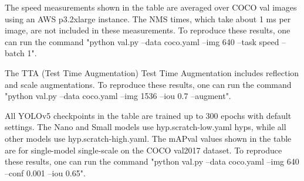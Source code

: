 \begin{itemize}
\begin{table}[h]
The speed measurements shown in the table are averaged over COCO val images using an AWS p3.2xlarge instance. The NMS times, which take about 1 ms per image, are not included in these measurements. To reproduce these results, one can run the command "python val.py --data coco.yaml --img 640 --task speed --batch 1".\cite{U23}

The TTA (Test Time Augmentation) Test Time Augmentation includes reflection and scale augmentations. To reproduce these results, one can run the command "python val.py --data coco.yaml --img 1536 --iou 0.7 --augment".\cite{U23}
\end{table}

\FloatBarrier
\FloatBarrier
\begin{table}[h]

\centering
{}

\label{tab:yolov5_comparison2}
\vspace{0.5cm}

\footnotesize All YOLOv5 checkpoints in the table are trained up to 300 epochs with default settings. The Nano and Small models use hyp.scratch-low.yaml hyps, while all other models use hyp.scratch-high.yaml. The mAPval values shown in the table are for single-model single-scale on the COCO val2017 dataset. To reproduce these results, one can run the command "python val.py --data coco.yaml --img 640 --conf 0.001 --iou 0.65".\cite{U23}


\end{table}
\end{itemize}
